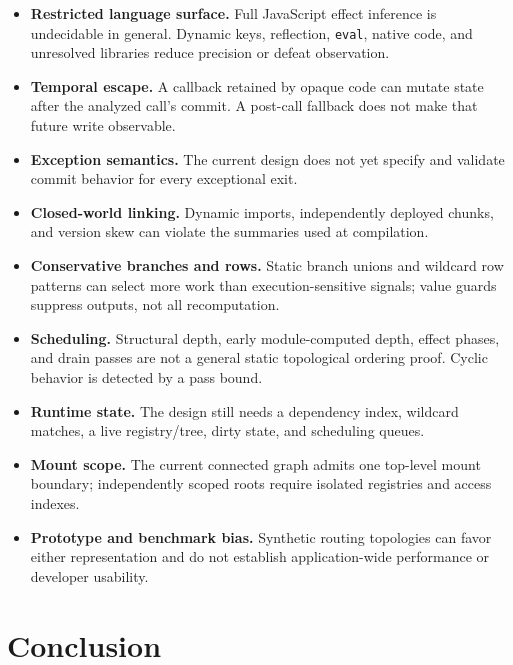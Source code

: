 \documentclass[conference]{IEEEtran}
\begin{document}
\begin{itemize}
  \item \textbf{Restricted language surface.} Full JavaScript effect inference
  is undecidable in general. Dynamic keys, reflection, \texttt{eval}, native
  code, and unresolved libraries reduce precision or defeat observation.
  \item \textbf{Temporal escape.} A callback retained by opaque code can mutate
  state after the analyzed call's commit. A post-call fallback does not make
  that future write observable.
  \item \textbf{Exception semantics.} The current design does not yet specify
  and validate commit behavior for every exceptional exit.
  \item \textbf{Closed-world linking.} Dynamic imports, independently deployed
  chunks, and version skew can violate the summaries used at compilation.
  \item \textbf{Conservative branches and rows.} Static branch unions and
  wildcard row patterns can select more work than execution-sensitive signals;
  value guards suppress outputs, not all recomputation.
  \item \textbf{Scheduling.} Structural depth, early module-computed depth,
  effect phases, and drain passes are not a general static topological ordering
  proof. Cyclic behavior is detected by a pass bound.
  \item \textbf{Runtime state.} The design still needs a dependency index,
  wildcard matches, a live registry/tree, dirty state, and scheduling queues.
  \item \textbf{Mount scope.} The current connected graph admits one top-level
  mount boundary; independently scoped roots require isolated registries and
  access indexes.
  \item \textbf{Prototype and benchmark bias.} Synthetic routing topologies
  can favor either representation and do not establish application-wide
  performance or developer usability.
\end{itemize}

\section{Conclusion}
\end{document}
